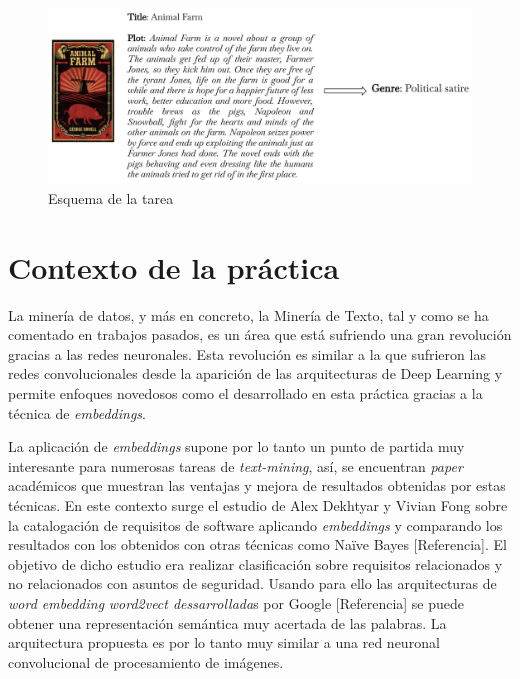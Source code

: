 \documentclass[12pt,a4paper, xcolor=table]{article}
\begin{document}
\vspace{12mm}

  \begin{figure}[!h]
    \centering
    \includegraphics[width=450px]{img/Animal Farm.png}
    \caption{Esquema de la tarea}
    \end{figure}

\newpage

\section{Contexto de la práctica}
La minería de datos, y más en concreto, la Minería de Texto, tal y como se ha comentado en trabajos pasados, es un área que está sufriendo una gran revolución gracias a las redes neuronales. Esta revolución es similar a la que sufrieron las redes convolucionales desde la aparición de las arquitecturas de Deep Learning y permite enfoques novedosos como el desarrollado en esta práctica gracias a la técnica de \textit{embeddings}.

\vspace{3mm}

La aplicación de \textit{embeddings} supone por lo tanto un punto de partida muy interesante para numerosas tareas de \textit{text-mining}, así, se encuentran \textit{paper} académicos que muestran las ventajas y mejora de resultados obtenidas por estas técnicas. En este contexto surge el estudio de Alex Dekhtyar y Vivian Fong sobre la catalogación de requisitos de software aplicando \textit{embeddings} y comparando los resultados con los obtenidos con otras técnicas como Naïve Bayes [Referencia]. El objetivo de dicho estudio era realizar clasificación sobre requisitos relacionados y no relacionados con asuntos de seguridad. Usando para ello las arquitecturas de\textit{ word embedding }\textit{word2vect dessarrollada}s por Google [Referencia] se puede obtener una representación semántica muy acertada de las palabras. La arquitectura propuesta es por lo tanto muy similar a una red neuronal convolucional de procesamiento de imágenes.
\end{document}
